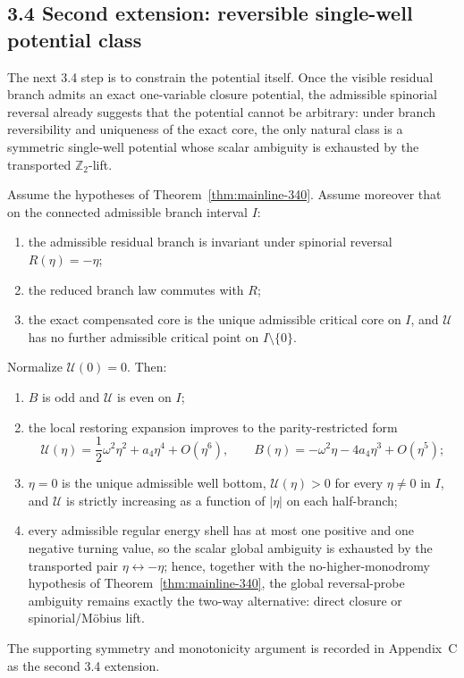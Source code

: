 \subsection*{3.4 Second extension: reversible single-well potential class}
The next 3.4 step is to constrain the potential itself. Once the visible residual branch admits an exact one-variable closure potential, the admissible spinorial reversal already suggests that the potential cannot be arbitrary: under branch reversibility and uniqueness of the exact core, the only natural class is a symmetric single-well potential whose scalar ambiguity is exhausted by the transported $\mathbb Z_2$-lift.

\begin{theorem}
\label{thm:mainline-341}
Assume the hypotheses of Theorem~\ref{thm:mainline-340}. Assume moreover that on the connected admissible branch interval $I$:
\begin{enumerate}[label=(\alph*)]
  \item the admissible residual branch is invariant under spinorial reversal $R(\eta)=-\eta$;
  \item the reduced branch law commutes with $R$;
  \item the exact compensated core is the unique admissible critical core on $I$, and $\mathcal U$ has no further admissible critical point on $I\setminus\{0\}$.
\end{enumerate}
Normalize $\mathcal U(0)=0$. Then:
\begin{enumerate}[label=(\roman*)]
  \item $B$ is odd and $\mathcal U$ is even on $I$;
  \item the local restoring expansion improves to the parity-restricted form
  \[
    \mathcal U(\eta)=\frac12\omega^2\eta^2+a_4\eta^4+O(\eta^6),
    \qquad
    B(\eta)=-\omega^2\eta-4a_4\eta^3+O(\eta^5);
  \]
  \item $\eta=0$ is the unique admissible well bottom, $\mathcal U(\eta)>0$ for every $\eta\neq 0$ in $I$, and $\mathcal U$ is strictly increasing as a function of $|\eta|$ on each half-branch;
  \item every admissible regular energy shell has at most one positive and one negative turning value, so the scalar global ambiguity is exhausted by the transported pair $\eta\leftrightarrow-\eta$; hence, together with the no-higher-monodromy hypothesis of Theorem~\ref{thm:mainline-340}, the global reversal-probe ambiguity remains exactly the two-way alternative: direct closure or spinorial/M\"obius lift.
\end{enumerate}
The supporting symmetry and monotonicity argument is recorded in Appendix~C as the second 3.4 extension.
\end{theorem}

